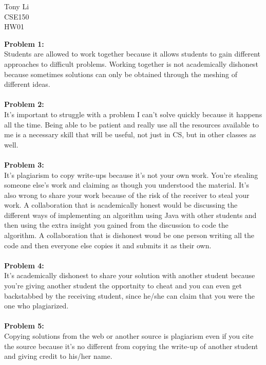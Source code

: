 \documentclass[12pt]{article} %
\begin{document}
\begin{flushleft} %
Tony Li  \\
CSE150 \\
HW01
\end{flushleft}

\noindent
\textbf{Problem 1:}
\\
\noindent
Students are allowed to work together because it allows students to gain different approaches
to difficult problems. Working together is not academically dishonest because sometimes solutions
can only be obtained through the meshing of different ideas. 
\\
\\
\textbf{Problem 2:}
\\
\noindent
It's important to struggle with a problem I can't solve quickly because it happens all the time.
Being able to be patient and really use all the resources available to me is a necessary skill
that will be useful, not just in CS, but in other classes as well. 
\\
\\
\textbf{Problem 3:}
\\
\noindent
It's plagiarism to copy write-ups because it's not your own work. You're stealing someone else's work 
and claiming as though you understood the material. It's also wrong to share your work because of the 
risk of the receiver to steal your work. A collaboration that is academically honest would be discussing
the different ways of implementing an algorithm using Java with other students and then using the 
extra insight you gained from the discussion to code the algorithm. A collaboration that is dishonest 
woud be one person writing all the code and then everyone else copies it and submits it as their own. 
\\
\\
\textbf{Problem 4:}
\\
\noindent
It's academically dishonest to share your solution with another student because you're giving 
another student the opportnity to cheat and you can even get backstabbed by the receiving
student, since he/she can claim that you were the one who plagiarized.
\\
\\
\textbf{Problem 5:}
\\
\noindent
Copying solutions from the web or another source is plagiarism even if you cite the source because
it's no different from copying the write-up of another student and giving credit to his/her name.
\\
\end{document}
